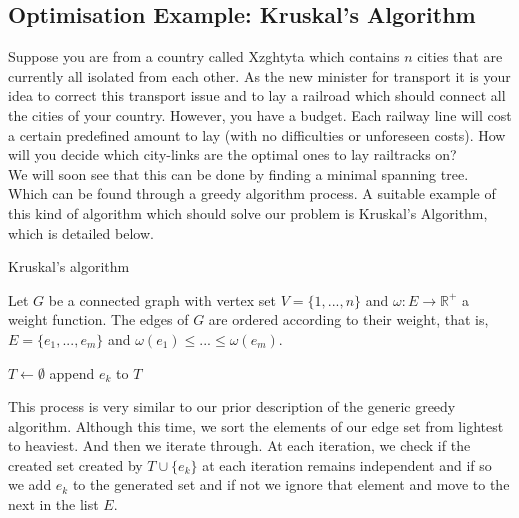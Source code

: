 \documentclass[../main.tex]{subfiles}
\begin{document}
\subsection{Optimisation Example: Kruskal's Algorithm}
\begin{exmp}
Suppose you are from a country called Xzghtyta which contains $n$ cities that are currently all isolated from each other.  As the new minister for transport it is your idea to correct this transport issue and to lay a railroad which should connect all the cities of your country. However, you have a budget. Each railway line will cost a certain predefined amount to lay (with no difficulties or unforeseen costs). How will you decide which city-links are the optimal ones to lay railtracks on?\\
\indent We will soon see that this can be done  by finding a minimal spanning tree. Which can be found through a greedy algorithm process. A suitable example of this kind of algorithm which should solve our problem is Kruskal's Algorithm, which is detailed below.
\end{exmp}

\begin{algorithm}[H]
\caption{Kruskal's algorithm}\label{kruskal}
Let $G$ be a connected graph with vertex set $V = \{1,...,n\}$ and $\omega:E \longrightarrow \mathbb{R^+}$ a weight function. The edges of $G$ are ordered according to their weight, that is, $E = \{e_1,...,e_m\}$ and $\omega(e_1) \leq ... \leq \omega(e_m).$
\begin{algorithmic}[1]
\State $T\gets \emptyset$
	 	\State append $e_k$ to $T$
	\EndIf
\EndFor
\EndProcedure
\end{algorithmic}
\end{algorithm}

This process is very similar to our prior description of the generic greedy algorithm. Although this time, we sort the elements of our edge set from lightest to heaviest. And then we iterate through. At each iteration, we check if the created set created by $T \cup \{e_k\}$ at each iteration remains independent and if so we add $e_k$ to the generated set and if not we ignore that element and move to the next in the list $E.$
\end{document}
